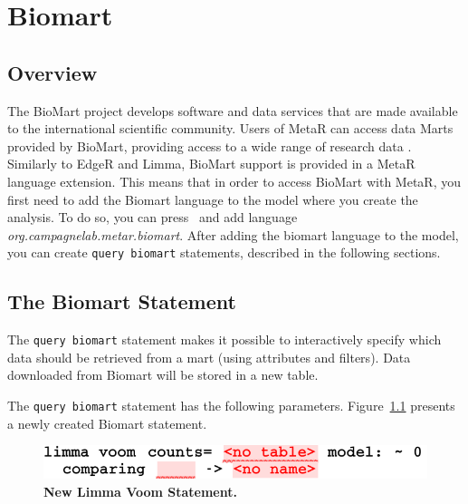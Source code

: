 

\chapter{Biomart}\label{chap:Biomart}

\section{Overview}
The BioMart project develops software and data services that are made available to the international scientific community. Users of MetaR can access data Marts provided by BioMart, providing access to a wide range of research data . Similarly to EdgeR and Limma, BioMart support is provided in a MetaR language extension. This means that in order to access BioMart with MetaR, you first need to add the Biomart language to the model where you create the analysis. To do so, you can press~ and add language \textit{org\allowbreak.campagnelab\allowbreak.metar\allowbreak.biomart}. After adding the biomart language to the model, you can create \texttt{query biomart} statements, described in the following sections. 

\section{The Biomart Statement}
The \texttt{query biomart} statement makes it possible to interactively specify which data should be retrieved from a mart (using attributes and filters). Data downloaded from Biomart will be stored in a new table. 

The \texttt{query biomart} statement has the following parameters. Figure~\ref{fig:NewLimmaVoom} presents a newly created Biomart statement.

 \begin{figure}[h!tbp]
  \centering
  \includegraphics[width=\figWidthWide]{figures/NewLimmaVoom.pdf}
\caption[New Limma Voom Statement.]{\textbf{New Limma Voom Statement.}}
\label{fig:NewLimmaVoom}
\end{figure}


